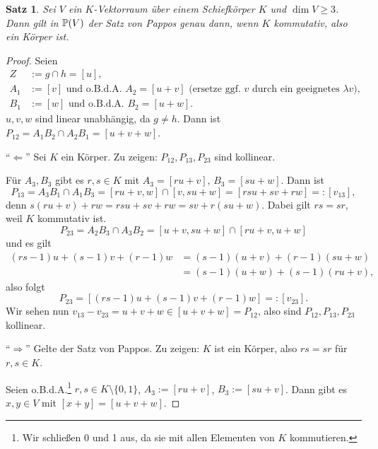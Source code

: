 \documentclass[
 a4paper,
 12pt,
 parskip=half
 ]{scrartcl}
\theoremstyle{plain}
\newtheorem{thm}{Satz}[section] %
\theoremstyle{definition}
\begin{document}
\begin{thm}
 Sei $V$ ein $K$-Vektorraum über einem Schiefkörper $K$ und $\dim V \ge 3$. Dann gilt in $\mathbb{P}(V)$ der Satz von Pappos genau dann, wenn $K$ kommutativ, also ein Körper ist.
\end{thm}

\begin{proof}
 Seien 
 \[ \begin{aligned}
     Z   &:= g \cap h = [u], \\
     A_1 &:= [v] \text{ und o.B.d.A. } A_2 = [u + v] \text{ (ersetze ggf. $v$ durch ein geeignetes $\lambda v$)}, \\
     B_1 &:= [w] \text{ und o.B.d.A. } B_2 = [u + w].
    \end{aligned} \]
 $u, v, w$ sind linear unabhängig, da $g \ne h$. Dann ist $P_{12} = A_1 B_2 \cap A_2 B_1 = [u + v + w]$. 
 
 ``$\Leftarrow$'' Sei $K$ ein Körper. Zu zeigen: $P_{12}, P_{13}, P_{23}$ sind kollinear.
 
 Für $A_3, B_3$ gibt es $r, s \in K$ mit $A_3 = [ru+v]$, $B_3 = [su+w]$. Dann ist 
 \[ P_{13} = A_3 B_1 \cap A_1 B_3 = [ru + v, w] \cap [v, su + w] = [rsu+sv+rw] =: [v_{13}], \]
 denn $s(ru+v) + rw = rsu + sv + rw = sv + r(su + w)$. Dabei gilt $rs = sr$, weil $K$ kommutativ ist.
 \[ P_{23} = A_2 B_3 \cap A_3 B_2 = [u+v, su + w] \cap [ru + v, u+w] \]
 und es gilt
 \[ \begin{aligned}
    (rs-1)u + (s-1)v + (r-1)w 
    &= (s-1) (u+v) + (r-1)(su +w) \\
    &= (s-1)(u+w) + (s-1)(ru+v),
    \end{aligned} \]
 also folgt
 \[ P_{23} = [ (rs-1)u + (s-1)v + (r-1)w ] =: [v_{23}]. \]
 Wir sehen nun $v_{13} - v_{23} = u + v + w \in [u + v + w] = P_{12}$, also sind $P_{12}, P_{13}, P_{23}$ kollinear.
 
 ``$\Rightarrow$'' Gelte der Satz von Pappos. Zu zeigen: $K$ ist ein Körper, also $rs = sr$ für $r,s \in K$.
 
 Seien o.B.d.A.\footnote{Wir schließen 0 und 1 aus, da sie mit allen Elementen von $K$ kommutieren.} $r,s \in K \setminus \{ 0, 1 \}$, $A_3 := [ru+v]$, $B_3 := [su+v]$. Dann gibt es $x,y \in V$ mit $[x+y] = [u + v + w]$.
 

\end{proof}
\end{document}
